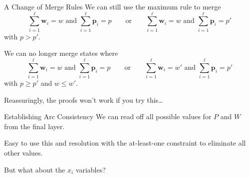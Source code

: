 \documentclass[aspectratio=169,compress,10pt]{beamer}
\begin{document}
\begin{frame}{A Change of Merge Rules}
    We can still use the maximum rule to merge \begin{equation*}
        \sum_{i=1}^{\ell} \boldsymbol{w}_i = w \text{~and~} \sum_{i=1}^{\ell} \boldsymbol{p}_i = p
        \qquad \text{or} \qquad
        \sum_{i=1}^{\ell} \boldsymbol{w}_i = w \text{~and~} \sum_{i=1}^{\ell} \boldsymbol{p}_i = p'
    \end{equation*}
    with $p > p'$.

    \bigskip

    We can no longer merge states where
    \begin{equation*}
            \sum_{i=1}^{\ell} \boldsymbol{w}_i = w \text{~and~} \sum_{i=1}^{\ell} \boldsymbol{p}_i = p
            \qquad \text{or} \qquad
            \sum_{i=1}^{\ell} \boldsymbol{w}_i = w' \text{~and~} \sum_{i=1}^{\ell} \boldsymbol{p}_i = p'
    \end{equation*}
    with $p \ge p'$ and $w \le w'$.

    \bigskip

    Reassuringly, the proofs won't work if you try this\ldots

\end{frame}

\begin{frame}{Establishing Arc Consistency}
    We can read off all possible values for $P$ and $W$ from the final layer.

    \bigskip

    Easy to use this and resolution with the at-least-one constraint to eliminate all
    other values.

    \bigskip

    But what about the $x_i$ variables?
\end{frame}
\end{document}
